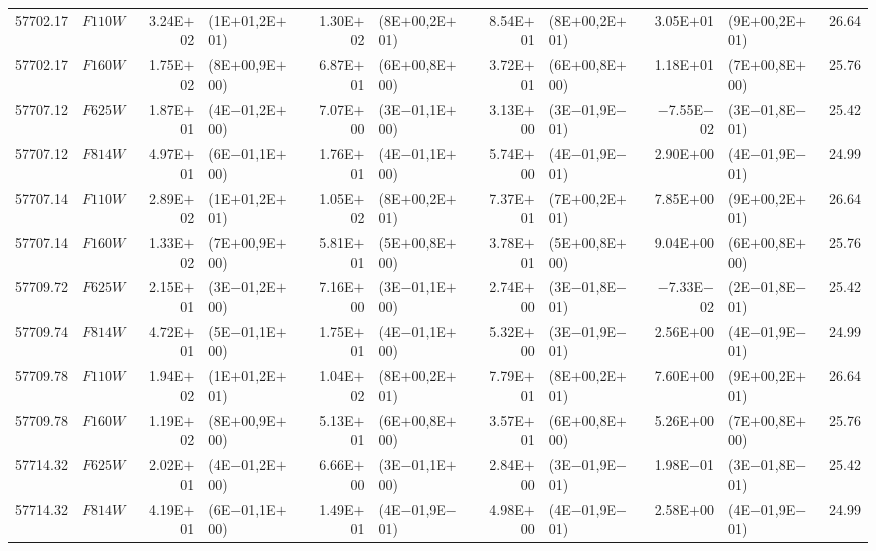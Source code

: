 \begin{tabular}{r c r @{\hspace{0.5em}} l r @{\hspace{0.5em}} l r @{\hspace{0.5em}} l r @{\hspace{0.5em}} l r}
57702.17 & $F110W$ & 3.24E$+$02 & (1E$+$01,2E$+$01) & 1.30E$+$02 & (8E$+$00,2E$+$01) & 8.54E$+$01 & (8E$+$00,2E$+$01) & 3.05E$+$01 & (9E$+$00,2E$+$01) & 26.64\\
57702.17 & $F160W$ & 1.75E$+$02 & (8E$+$00,9E$+$00) & 6.87E$+$01 & (6E$+$00,8E$+$00) & 3.72E$+$01 & (6E$+$00,8E$+$00) & 1.18E$+$01 & (7E$+$00,8E$+$00) & 25.76\\
57707.12 & $F625W$ & 1.87E$+$01 & (4E$-$01,2E$+$00) & 7.07E$+$00 & (3E$-$01,1E$+$00) & 3.13E$+$00 & (3E$-$01,9E$-$01) & $-$7.55E$-$02 & (3E$-$01,8E$-$01) & 25.42\\
57707.12 & $F814W$ & 4.97E$+$01 & (6E$-$01,1E$+$00) & 1.76E$+$01 & (4E$-$01,1E$+$00) & 5.74E$+$00 & (4E$-$01,9E$-$01) & 2.90E$+$00 & (4E$-$01,9E$-$01) & 24.99\\
57707.14 & $F110W$ & 2.89E$+$02 & (1E$+$01,2E$+$01) & 1.05E$+$02 & (8E$+$00,2E$+$01) & 7.37E$+$01 & (7E$+$00,2E$+$01) & 7.85E$+$00 & (9E$+$00,2E$+$01) & 26.64\\
57707.14 & $F160W$ & 1.33E$+$02 & (7E$+$00,9E$+$00) & 5.81E$+$01 & (5E$+$00,8E$+$00) & 3.78E$+$01 & (5E$+$00,8E$+$00) & 9.04E$+$00 & (6E$+$00,8E$+$00) & 25.76\\
57709.72 & $F625W$ & 2.15E$+$01 & (3E$-$01,2E$+$00) & 7.16E$+$00 & (3E$-$01,1E$+$00) & 2.74E$+$00 & (3E$-$01,8E$-$01) & $-$7.33E$-$02 & (2E$-$01,8E$-$01) & 25.42\\
57709.74 & $F814W$ & 4.72E$+$01 & (5E$-$01,1E$+$00) & 1.75E$+$01 & (4E$-$01,1E$+$00) & 5.32E$+$00 & (3E$-$01,9E$-$01) & 2.56E$+$00 & (4E$-$01,9E$-$01) & 24.99\\
57709.78 & $F110W$ & 1.94E$+$02 & (1E$+$01,2E$+$01) & 1.04E$+$02 & (8E$+$00,2E$+$01) & 7.79E$+$01 & (8E$+$00,2E$+$01) & 7.60E$+$00 & (9E$+$00,2E$+$01) & 26.64\\
57709.78 & $F160W$ & 1.19E$+$02 & (8E$+$00,9E$+$00) & 5.13E$+$01 & (6E$+$00,8E$+$00) & 3.57E$+$01 & (6E$+$00,8E$+$00) & 5.26E$+$00 & (7E$+$00,8E$+$00) & 25.76\\
57714.32 & $F625W$ & 2.02E$+$01 & (4E$-$01,2E$+$00) & 6.66E$+$00 & (3E$-$01,1E$+$00) & 2.84E$+$00 & (3E$-$01,9E$-$01) & 1.98E$-$01 & (3E$-$01,8E$-$01) & 25.42\\
57714.32 & $F814W$ & 4.19E$+$01 & (6E$-$01,1E$+$00) & 1.49E$+$01 & (4E$-$01,9E$-$01) & 4.98E$+$00 & (4E$-$01,9E$-$01) & 2.58E$+$00 & (4E$-$01,9E$-$01) & 24.99\\
\hline\hline
\end{tabular}
